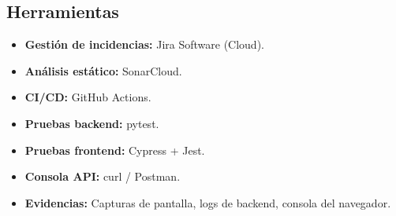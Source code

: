 \subsection{Herramientas}
\label{subsec:herramientas}

\begin{itemize}
    \item \textbf{Gestión de incidencias:} Jira Software (Cloud).
    \item \textbf{Análisis estático:} SonarCloud.
    \item \textbf{CI/CD:} GitHub Actions.
    \item \textbf{Pruebas backend:} pytest.
    \item \textbf{Pruebas frontend:} Cypress + Jest.
    \item \textbf{Consola API:} curl / Postman.
    \item \textbf{Evidencias:} Capturas de pantalla, logs de backend, consola del navegador.
\end{itemize}
